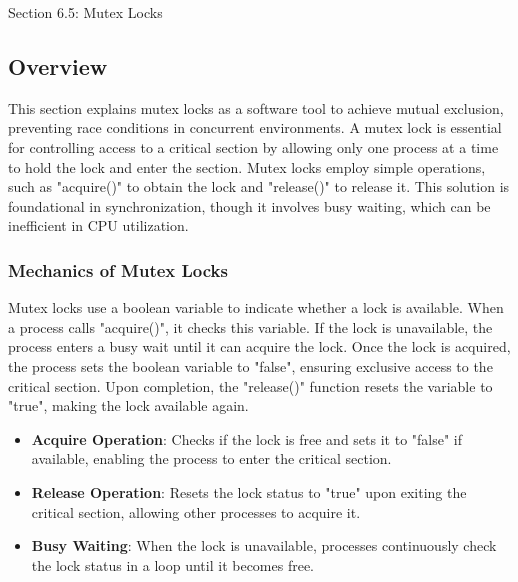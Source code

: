 \begin{notes}{Section 6.5: Mutex Locks}
    \subsection*{Overview}

    This section explains mutex locks as a software tool to achieve mutual exclusion, preventing race conditions in concurrent environments. A mutex lock is essential for controlling access to a critical 
    section by allowing only one process at a time to hold the lock and enter the section. Mutex locks employ simple operations, such as "acquire()" to obtain the lock and "release()" to release it. 
    This solution is foundational in synchronization, though it involves busy waiting, which can be inefficient in CPU utilization.
    
    \subsubsection*{Mechanics of Mutex Locks}
    
    Mutex locks use a boolean variable to indicate whether a lock is available. When a process calls "acquire()", it checks this variable. If the lock is unavailable, the process enters a busy wait 
    until it can acquire the lock. Once the lock is acquired, the process sets the boolean variable to "false", ensuring exclusive access to the critical section. Upon completion, the "release()" 
    function resets the variable to "true", making the lock available again.
    
    \begin{highlight}
    
        \begin{itemize}
            \item \textbf{Acquire Operation}: Checks if the lock is free and sets it to "false" if available, enabling the process to enter the critical section.
            \item \textbf{Release Operation}: Resets the lock status to "true" upon exiting the critical section, allowing other processes to acquire it.
            \item \textbf{Busy Waiting}: When the lock is unavailable, processes continuously check the lock status in a loop until it becomes free.
        \end{itemize}
    
    \end{highlight}
    

\end{notes}

